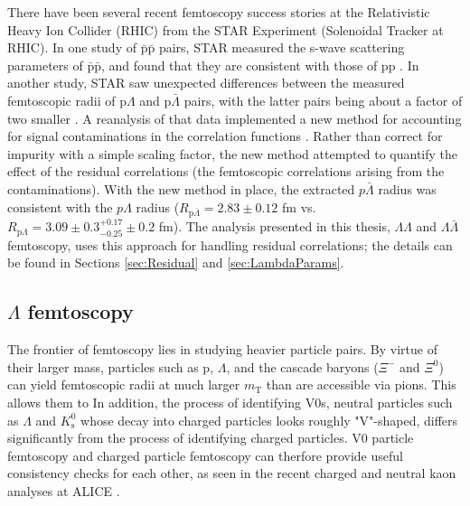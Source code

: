 There have been several recent femtoscopy success stories at the Relativistic Heavy Ion Collider (RHIC) from the STAR Experiment (Solenoidal Tracker at RHIC).
In one study of $\bar{\mathrm{p}}\bar{\mathrm{p}}$ pairs, STAR measured the s-wave scattering parameters of $\bar{\mathrm{p}}\bar{\mathrm{p}}$, and found that they are consistent with those of pp \cite{Adamczyk:2015hza}.
In another study, STAR saw unexpected differences between the measured femtoscopic radii of p$\Lambda$ and p$\bar{\Lambda}$ pairs, with the latter pairs being about a factor of two smaller \cite{Adams:2005ws}.
A reanalysis of that data implemented a new method for accounting for signal contaminations in the correlation functions \cite{Kisiel:2014mma}.
Rather than correct for impurity with a simple scaling factor, the new method attempted to quantify the effect of the residual correlations (the femtoscopic correlations arising from the contaminations).
With the new method in place, the extracted $p\bar{\Lambda}$ radius was consistent with the $p\Lambda$ radius ($R_{\mathrm{p}\bar{\Lambda}} = 2.83 \pm 0.12$ fm vs.\ $R_{\mathrm{p}\Lambda} = 3.09 \pm 0.3^{+0.17}_{-0.25} \pm 0.2$ fm).
The analysis presented in this thesis, $\Lambda\Lambda$ and $\Lambda\bar{\Lambda}$ femtoscopy, uses this approach for handling residual correlations; the details can be found in Sections \ref{sec:Residual} and \ref{sec:LambdaParams}.


\subsection{$\Lambda$ femtoscopy}
\label{sec:LambdaFemto}

The frontier of femtoscopy lies in studying heavier particle pairs.
By virtue of their larger mass, particles such as p, $\Lambda$, and the cascade baryons ($\Xi^-$ and $\Xi^0$) can yield femtoscopic radii at much larger $m_\mathrm{T}$ than are accessible via pions.
This allows them to 
In addition, the process of identifying V0s, neutral particles such as $\Lambda$ and $K^0_\mathrm{s}$ whose decay into charged particles looks roughly "V"-shaped, differs significantly from the process of identifying charged particles.
V0 particle femtoscopy and charged particle femtoscopy can therfore provide useful consistency checks for each other, as seen in the recent charged and neutral kaon analyses at ALICE \cite{Adam:2015vja}.

